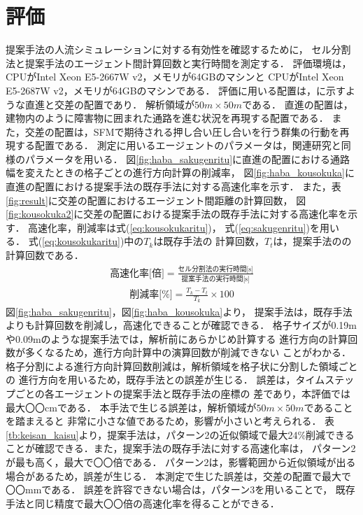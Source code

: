 \documentclass{maelab_y}
\newcommand{\分類条件}{%
\begin{table}[t]
\begin{center}
\caption{進行方向を分類する条件}
\ecaption{Classification condition of moving direction $e_{i}$.}
\label{tb:hantei_jouken}
\begin{tabular}{c|c|c|c|c}
\hline \hline
			& 右 & 左 & 上 & 下 \\ \hline
パターン2   & $\frac{1}{\sqrt{2}} < e_x \leq 1  $
		    & $ -1 \leq e_x < \frac{-1}{\sqrt{2}}$ 
		    & $ \frac{-1}{\sqrt{2}} < e_x < \frac{1}{\sqrt{2}} $ 
		    & $ \frac{-1}{2} < e_x < \frac{1}{2} $ \\
パターン3   & $\frac{-1}{2} < e_y < \frac{1}{2} $ 
		    & $\frac{-1}{2} < e_y < \frac{1}{2} $
            & $ \frac{1}{\sqrt{2}} < e_y \leq 1$
		    & $ -1 \leq e_y < \frac{-1}{\sqrt{2}} $ \\
\hline
\multirow{2}{*}{パターン4}   
			& $R_x \geq A_x$ & $R_x < A_x$ & $R_y \geq A_y$ & $R_y < A_y $ \\
	        &  $L_x \geq A_x$ & $L_x < A_x$ & $L_y \geq A_y$ & $L_y < A_y$ \\
\hline
\multirow{2}{*}{パターン5}   
 			& $R_x \geq x_1$ & $R_x < x_2$ & $R_y \geq y_1$ & $R_y < y_2 $ \\
			& $L_x \geq x_1$ & $L_x < x_2$ & $L_y \geq y_1$ & $L_y < y_2 $ \\
\hline
パターン6   & $ \cos(\frac{1}{2}\theta_{view}) \leq  e_y $ 
			& $ e_y \leq -\cos(\frac{1}{2}\theta_{view})$ 
			& $ \sin(\frac{1}{2}(\pi - \theta_{view})) \leq e_x $ 
			& $ e_x \leq \sin(\frac{1}{2}(\pi - \theta_{view}))  $ \\
\hline
\end{tabular}
\end{center}
\end{table}
}%
\newcommand{\距離計算new}{%
  \begin{table}[hbtp]
    \begin{center}
    \caption{エージェント間距離の計算回数[$10^{10}$回]}
    \label{tb:keisan_kaisu}
    \begin{tabular}{c|llllll}
    \hline \hline
    \multirow{2}{*}{人数}   & \multicolumn{6}{c}{パターン}                                                                                                                                                             \\ \cline{2-7} 
                          & \multicolumn{1}{c|}{1}    & \multicolumn{1}{c|}{2}               & \multicolumn{1}{c|}{3}      & \multicolumn{1}{c|}{4}      & \multicolumn{1}{c|}{5}      & \multicolumn{1}{c}{6}    \\ \hline
    \multirow{2}{*}{3000} & \multicolumn{1}{r|}{5.1}  & \multicolumn{1}{r|}{\textbf{3.9}}    & \multicolumn{1}{r|}{4.0}    & \multicolumn{1}{r|}{4.4}    & \multicolumn{1}{r|}{4.1}    & \multicolumn{1}{r}{4.4}  \\
                          & \multicolumn{1}{l|}{}     & \multicolumn{1}{l|}{\textbf{(24\%)}} & \multicolumn{1}{l|}{(23\%)} & \multicolumn{1}{l|}{(15\%)} & \multicolumn{1}{l|}{(21\%)} & (15\%)                   \\ \hline
    \multirow{2}{*}{5000} & \multicolumn{1}{r|}{14.4} & \multicolumn{1}{r|}{\textbf{10.9}}   & \multicolumn{1}{r|}{11.1}   & \multicolumn{1}{r|}{12.2}   & \multicolumn{1}{r|}{11.4}   & \multicolumn{1}{r}{12.2} \\
                          & \multicolumn{1}{l|}{}     & \multicolumn{1}{l|}{\textbf{(24\%)}} & \multicolumn{1}{l|}{(23\%)} & \multicolumn{1}{l|}{(15\%)} & \multicolumn{1}{l|}{(21\%)} & (15\%)                   \\ \hline
    \multirow{2}{*}{7500} & \multicolumn{1}{r|}{33.1} & \multicolumn{1}{r|}{\textbf{25.2}}   & \multicolumn{1}{r|}{25.8}   & \multicolumn{1}{r|}{28.3}   & \multicolumn{1}{r|}{26.7}   & \multicolumn{1}{r}{28.3} \\
                          & \multicolumn{1}{l|}{}     & \multicolumn{1}{l|}{\textbf{(24\%)}} & \multicolumn{1}{l|}{(22\%)} & \multicolumn{1}{l|}{(15\%)} & \multicolumn{1}{l|}{(20\%)} & (15\%)                   \\ \hline
    \end{tabular}
    \end{center}
    \end{table}
}%
\newcommand{\粒子数}{%
\begin{table}[hbtp]
  \begin{center}
    \caption{各配置の詳細}
    \label{tb:haichi_para}
    \begin{tabular}{c|c|c}
      \hline \hline
      & 教室 & 演習室 \\ \hline 
      エージェント数[人] & 96 & 204 \\ \hline
      壁粒子数[個] & 1037 & 1454\\ \hline
      経由地数[個] & 12   & 26 \\ \hline
      解析領域 & $50m\times50m$ & $50m\times50m$ \\ \hline
    \end{tabular}
  \end{center}
\end{table}
}%
\newcommand{\評価環境}{%
\begin{table}[hbtp]
  \begin{center}
    \caption{各配置の詳細}
    \label{tb:haichi_para}
    \begin{tabular}{c|c|c}
      \hline \hline
                 & マシン1                & マシン2 \\ \hline 
      CPU        & Intel Xeon E5-2687W & Intel Xeon E5-2667W \\ \hline
      メモリ     & 64GB                   & 64GB \\ \hline
      OS         & Linux 4.12.9            & Linux 6.5.8 \\ \hline
      コンパイラ & gcc 7.2.0             & gcc 13.2.0 \\ \hline
    \end{tabular}
  \end{center}
\end{table}
}%
\newcommand{\判定条件new}{%
  \begin{table}[hbtp]
    \centering
		\caption{パターンごとの進行方向分類条件}
		\label{tb:joken}
		{\scriptsize
    \begin{tabular}{Wc{0.5em}|cccWc{8em}}
    \hline \hline
                          & \multicolumn{1}{c|}{パターン2，3} & \multicolumn{1}{c|}{パターン4}   & \multicolumn{1}{c|}{パターン5}   & パターン6                   \\ \hline
    \multirow{2}{*}{右}    & \multicolumn{1}{c|}{$\frac{1}{\sqrt{2}} < e_x \leq 1$}  & \multicolumn{1}{c|}{$R_x \geq A_x$}  & \multicolumn{1}{c|}{$R_x \geq x_1$}  & \multirow{2}{*}{$ \cos(\frac{1}{2}\theta_v) \leq  e_y $} \\
                          & \multicolumn{1}{c|}{$\frac{-1}{2} < e_y < \frac{1}{2} $}   & \multicolumn{1}{l|}{$L_x \geq A_x$} & \multicolumn{1}{l|}{$L_x \geq x_1$} &                     \\ \hline
    \multirow{2}{*}{左}    & \multicolumn{1}{c|}{$ -1 \leq e_x < \frac{-1}{\sqrt{2}}$}  & \multicolumn{1}{c|}{$R_x < A_x$}  & \multicolumn{1}{c|}{$R_x < x_2$}  & \multirow{2}{*}{$ e_y \leq -\cos(\frac{1}{2}\theta_{v})$} \\
                          & \multicolumn{1}{l|}{$\frac{-1}{2} < e_y < \frac{1}{2} $}   & \multicolumn{1}{l|}{$L_x < A_x$} & \multicolumn{1}{l|}{$L_x < x_2$ } &                     \\ \hline
    \multirow{2}{*}{上}    & \multicolumn{1}{c|}{$ \frac{-1}{\sqrt{2}} < e_x < \frac{1}{\sqrt{2}}$}  & \multicolumn{1}{c|}{$R_y \geq A_y$ }  & \multicolumn{1}{c|}{$R_y \geq y_1$ }  & \multirow{2}{*}{$ \sin(\frac{1}{2}(\theta_{\pi - v})) \leq e_x$} \\
                          & \multicolumn{1}{l|}{$ \frac{1}{\sqrt{2}} < e_y \leq 1$}   & \multicolumn{1}{l|}{$L_y \geq A_y$} & \multicolumn{1}{l|}{$L_y \geq y_1$} &                     \\ \hline
    \multirow{2}{*}{下}    & \multicolumn{1}{c|}{$ \frac{-1}{2} < e_x < \frac{1}{2} $}  & \multicolumn{1}{c|}{$R_y < A_y $}  & \multicolumn{1}{c|}{$R_y < y_2 $ }  & \multirow{2}{*}{$ e_x \leq \sin(\frac{1}{2}(\theta_{\pi - v}))$} \\
                          & \multicolumn{1}{l|}{$ -1 \leq e_y < \frac{-1}{\sqrt{2}} $}   & \multicolumn{1}{l|}{$L_y < A_y$} & \multicolumn{1}{l|}{$L_y < y_2 $ } &                     \\ \hline
    \end{tabular}
		}
    \end{table}
}%
\begin{document}
\section{評価}
提案手法の人流シミュレーションに対する有効性を確認するために，
セル分割法と提案手法のエージェント間計算回数と実行時間を測定する．
評価環境は，CPUがIntel Xeon E5-2667W v2，メモリが64GBのマシンと
CPUがIntel Xeon E5-2687W v2，メモリが64GBのマシンである．
評価に用いる配置は，に示すような直進と交差の配置であり．
解析領域が$50m\times50m$である．
直進の配置は，建物内のように障害物に囲まれた通路を進む状況を再現する配置である．
また，交差の配置は，SFMで期待される押し合い圧し合いを行う群集の行動を再現する配置である．
測定に用いるエージェントのパラメータは，関連研究\cite{helbing_sfm}と同様のパラメータを用いる．
図\ref{fig:haba_sakugenritu}に直進の配置における通路幅を変えたときの格子ごとの進行方向計算の削減率，
図\ref{fig:haba_kousokuka}に直進の配置における提案手法の既存手法に対する高速化率を示す．
また，表\ref{fig:result}に交差の配置におけるエージェント間距離の計算回数，
図\ref{fig:kousokuka2}に交差の配置における提案手法の既存手法に対する高速化率を示す．
%
高速化率，削減率は式(\ref{eq:kousokukaritu})，
式(\ref{eq:sakugenritu})を用いる．
式(\ref{eq:kousokukaritu})中の$T_{k}$は既存手法の
計算回数，$T_{t}$は，提案手法のの計算回数である．
%
\begin{eqnarray}
  \label{eq:kousokukaritu}
  \mbox{高速化率[倍]} =
  \frac{\mbox{セル分割法の実行時間[s]}}{\mbox{提案手法の実行時間[s]}}
\end{eqnarray}
%
\begin{eqnarray}
  \label{eq:sakugenritu}
  \mbox{削減率[\%]} =
  \frac{T_{k} - T_{t}}{T_{k}} \times 100
\end{eqnarray}\vspace{1mm}
%
図\ref{fig:haba_sakugenritu}，図\ref{fig:haba_kousokuka}より，
提案手法は，既存手法よりも計算回数を削減し，高速化できることが確認できる．
格子サイズが0.19mや0.09mのような提案手法では，解析前にあらかじめ計算する
進行方向の計算回数が多くなるため，進行方向計算中の演算回数が削減できない
ことがわかる．
格子分割による進行方向計算回数削減は，解析領域を格子状に分割した領域ごとの
進行方向を用いるため，既存手法との誤差が生じる．
誤差は，タイムステップごとの各エージェントの提案手法と既存手法の座標の
差であり，本評価では最大〇〇cmである．
本手法で生じる誤差は，解析領域が$50m\times50m$であることを踏まえると
非常に小さな値であるため，影響が小さいと考えられる．
表\ref{tb:keisan_kaisu}より，提案手法は，パターン2の近似領域で最大24\%削減できる
ことが確認できる．また，提案手法の既存手法に対する高速化率は，
パターン2が最も高く，最大で〇〇倍である．
パターン2は，影響範囲から近似領域が出る場合があるため，誤差が生じる．
本測定で生じた誤差は，交差の配置で最大で〇〇mmである．
誤差を許容できない場合は，パターン3を用いることで，
既存手法と同じ精度で最大〇〇倍の高速化率を得ることができる．
\end{document}
